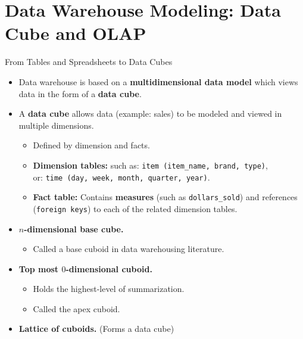 \section{Data Warehouse Modeling: Data Cube and OLAP}


\begin{frame}{From Tables and Spreadsheets to Data Cubes}
	\begin{itemize}
		\item Data warehouse is based on a \textbf{\color{airforceblue}multidimensional data model} which views data in the form of a \textbf{data cube}.
		\item A {\color{faugray}\textbf{data cube}} allows data (example: sales) to be modeled and viewed in multiple dimensions.
		      \begin{itemize}
			      \item Defined by dimension and facts.
			      \item \textbf{Dimension tables:} such as: \texttt{item (item\_name, brand, type)},\\
			            or: \texttt{time (day, week, month, quarter, year)}.
			      \item \textbf{Fact table:} Contains \textbf{measures} (such as \texttt{dollars\_sold}) and references (\texttt{foreign keys}) to each of the related dimension tables.
		      \end{itemize}
		\item \textbf{$n$-dimensional base cube.}
		      \begin{itemize}
			      \item Called a base cuboid in data warehousing literature.
		      \end{itemize}
		\item \textbf{Top most $0$-dimensional cuboid.}
		      \begin{itemize}
			      \item Holds the highest-level of summarization.
			      \item Called the apex cuboid.
		      \end{itemize}
		\item \textbf{Lattice of cuboids.} (Forms a data cube)
	\end{itemize}
\end{frame}

